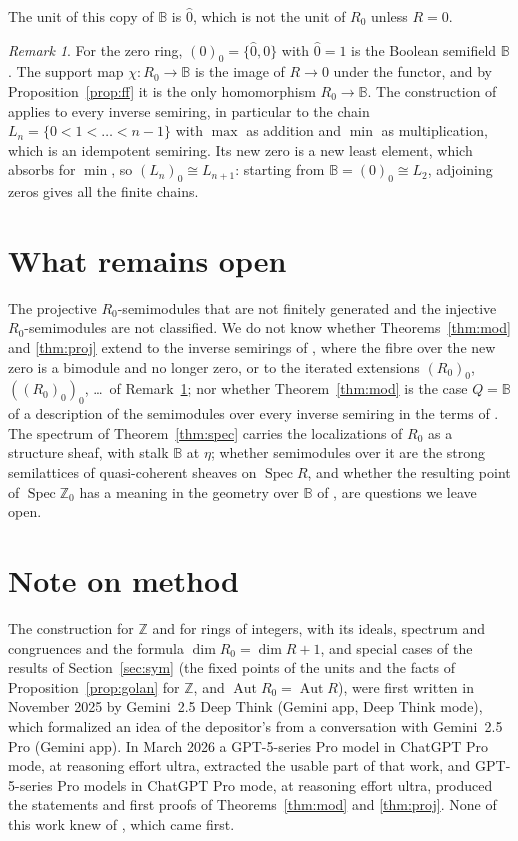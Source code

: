 \documentclass[11pt]{amsart}
\theoremstyle{remark}
\newtheorem{remark}[thm]{Remark}
\newcommand{\B}{\mathbb B}
\newcommand{\oz}{\widehat{0}}
\DeclareMathOperator{\Spec}{Spec}
\begin{document}
The unit of this copy of $\B$ is $\oz$, which is not the unit of $R_0$ unless $R=0$.

\begin{remark}\label{rem:chains}
For the zero ring, $(0)_0=\{\oz,0\}$ with $\oz=1$ is the Boolean semifield $\B$. The support map $\chi\colon R_0\to\B$ is the image of $R\to0$ under the functor, and by Proposition~\ref{prop:ff} it is the only homomorphism $R_0\to\B$. The construction of \cite[Definition 3.6]{FGJM} applies to every inverse semiring, in particular to the chain $L_n=\{0<1<\dots<n-1\}$ with $\max$ as addition and $\min$ as multiplication, which is an idempotent semiring. Its new zero is a new least element, which absorbs for $\min$, so $(L_n)_0\cong L_{n+1}$: starting from $\B=(0)_0\cong L_2$, adjoining zeros gives all the finite chains.
\end{remark}

\section{What remains open}
The projective $R_0$-semimodules that are not finitely generated and the injective $R_0$-semimodules are not classified. We do not know whether Theorems~\ref{thm:mod} and \ref{thm:proj} extend to the inverse semirings of \cite[Construction 3.5]{FGJM}, where the fibre over the new zero is a bimodule and no longer zero, or to the iterated extensions $(R_0)_0$, $((R_0)_0)_0$, \dots\ of Remark~\ref{rem:chains}; nor whether Theorem~\ref{thm:mod} is the case $Q=\B$ of a description of the semimodules over every inverse semiring in the terms of \cite[Theorem~8.5]{CFMM}. The spectrum of Theorem~\ref{thm:spec} carries the localizations of $R_0$ as a structure sheaf, with stalk $\B$ at $\eta$; whether semimodules over it are the strong semilattices of quasi-coherent sheaves on $\Spec R$, and whether the resulting point of $\Spec\mathbb Z_0$ has a meaning in the geometry over $\B$ of \cite{CC}, are questions we leave open.

\section*{Note on method}
The construction for $\mathbb Z$ and for rings of integers, with its ideals, spectrum and congruences and the formula $\dim R_0=\dim R+1$, and special cases of the results of Section~\ref{sec:sym} (the fixed points of the units and the facts of Proposition~\ref{prop:golan} for $\mathbb Z$, and $\operatorname{Aut}R_0=\operatorname{Aut}R$), were first written in November 2025 by Gemini~2.5 Deep Think (Gemini app, Deep Think mode), which formalized an idea of the depositor's from a conversation with Gemini~2.5 Pro (Gemini app). In March 2026 a GPT-5-series Pro model in ChatGPT Pro mode, at reasoning effort ultra, extracted the usable part of that work, and GPT-5-series Pro models in ChatGPT Pro mode, at reasoning effort ultra, produced the statements and first proofs of Theorems~\ref{thm:mod} and \ref{thm:proj}. None of this work knew of \cite{FGJM}, which came first.
\end{document}
